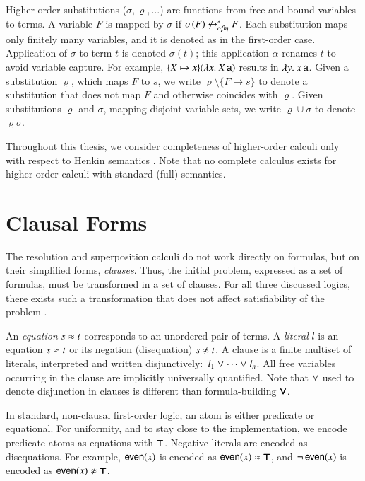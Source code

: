 Higher-order substitutions ($\sigma,\varrho,\ldots$) are functions from free and bound
variables to terms. A variable $F$ is mapped by $\sigma$ if $ \sigma(F) \not\equi
F$. Each substitution maps only finitely many variables, and it is denoted as in
the first-order case. Application of  $\sigma$ to term $t$ is denoted $\sigma(t)$;
this application $\alpha$-renames $t$ to avoid variable capture. For example,
$\{X \mapsto x\}(\lambda x.\> X \, \mathsf{a})$ results in $\lambda y.\> x \, \mathsf{a}$.  Given a substitution
$\varrho$, which maps $F$ to $s$, we write $\varrho\setminus\{F \mapsto s\}$ to
denote a substitution that does not map $F$ and otherwise coincides with
$\varrho$. Given substitutions $\varrho$ and $\sigma$, mapping disjoint variable
sets, we write $\varrho \cup \sigma$ to denote $\varrho\sigma$.

Throughout this thesis, we consider completeness of higher-order calculi only
with respect to Henkin semantics \cite{bm-14-automation-ho}. Note that no
complete calculus exists for higher-order calculi with standard (full)
semantics.

\section{Clausal Forms}

The resolution and superposition calculi do not work directly on formulas, but
on their simplified forms, {\em clauses}. Thus, the initial problem, expressed as a
set of formulas, must be transformed in a set of clauses. For all three
discussed logics, there exists such a transformation that does not affect
satisfiability of the problem \cite{nw-01-small-cnf}.

An {\em equation} $s \approx t$ corresponds to an unordered pair of terms. A {\em literal} $l$ is an equation $s \approx t$ or its negation (disequation) $s \noteq t$. A clause is a
finite multiset of literals, interpreted and written disjunctively:\ $l_1 \mathrel\lor
\cdots \mathrel\lor l_n$. All free variables occurring in the clause are implicitly
universally quantified. Note that $\mathrel\lor$ used to denote disjunction in clauses
is different than formula-building $\pmb\lor$.

In standard, non-clausal first-order logic, an atom is either
predicate or equational. For uniformity, and to
stay close to the implementation, we encode predicate atoms as equations with
$\pmb\top$. Negative literals are encoded as disequations. For example,
$\mathsf{even}(x)$ is encoded as $\mathsf{even}(x) \approx \pmb\top$, and
$\neg\,\mathsf{even}(x)$ is encoded as $\neglit{\cst{even}(x)}$. 

